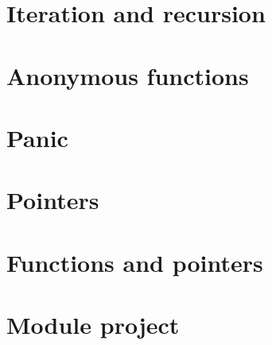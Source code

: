 \documentclass[]{book}
\begin{document}
\hypertarget{iteration-and-recursion}{%
\section{Iteration and recursion}\label{iteration-and-recursion}}

\hypertarget{anonymous-functions}{%
\section{Anonymous functions}\label{anonymous-functions}}

\hypertarget{panic}{%
\section{Panic}\label{panic}}

\hypertarget{pointers}{%
\section{Pointers}\label{pointers}}

\hypertarget{functions-and-pointers-1}{%
\section{Functions and pointers}\label{functions-and-pointers-1}}

\hypertarget{module-project-2}{%
\section*{Module project}\label{module-project-2}}
\end{document}

